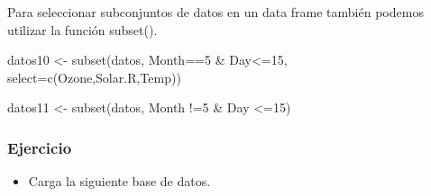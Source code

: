 \documentclass[
]{book}
\newenvironment{Shaded}{\begin{snugshade}}{\end{snugshade}}
\newcommand{\AttributeTok}[1]{\textcolor[rgb]{0.77,0.63,0.00}{#1}}
\newcommand{\DecValTok}[1]{\textcolor[rgb]{0.00,0.00,0.81}{#1}}
\newcommand{\FloatTok}[1]{\textcolor[rgb]{0.00,0.00,0.81}{#1}}
\newcommand{\FunctionTok}[1]{\textcolor[rgb]{0.00,0.00,0.00}{#1}}
\newcommand{\NormalTok}[1]{#1}
\newcommand{\OtherTok}[1]{\textcolor[rgb]{0.56,0.35,0.01}{#1}}
\newcommand{\SpecialCharTok}[1]{\textcolor[rgb]{0.00,0.00,0.00}{#1}}
\providecommand{\tightlist}{%
  \setlength{\itemsep}{0pt}\setlength{\parskip}{0pt}}
\begin{document}
\begin{Shaded}
\end{Shaded}

Para seleccionar subconjuntos de datos en un data frame también podemos utilizar la función subset().

\begin{Shaded}
\begin{Highlighting}[]
\NormalTok{datos10 }\OtherTok{\textless{}{-}} \FunctionTok{subset}\NormalTok{(datos, Month}\SpecialCharTok{==}\DecValTok{5} \SpecialCharTok{\&}\NormalTok{ Day}\SpecialCharTok{\textless{}=}\DecValTok{15}\NormalTok{, }\AttributeTok{select=}\FunctionTok{c}\NormalTok{(Ozone,Solar.R,Temp))}

\NormalTok{datos11 }\OtherTok{\textless{}{-}} \FunctionTok{subset}\NormalTok{(datos, Month }\SpecialCharTok{!=}\DecValTok{5} \SpecialCharTok{\&}\NormalTok{ Day }\SpecialCharTok{\textless{}=}\DecValTok{15}\NormalTok{)}
\end{Highlighting}
\end{Shaded}

\hypertarget{ejercicio}{%
\subsubsection{Ejercicio}\label{ejercicio}}

\begin{itemize}
\tightlist
\item
  Carga la siguiente base de datos.
\end{itemize}
\end{document}
